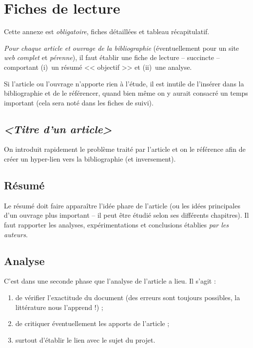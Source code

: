 \documentclass[11pt, french]{report-rd-info}
\begin{document}
\chapter{Fiches de lecture}
\label{ann:FichesLecture}

Cette annexe est \emph{obligatoire}, fiches détaillées et tableau récapitulatif.

\emph{Pour chaque article et ouvrage de la bibliographie} (éventuellement pour un site \emph{web} \emph{complet} et \emph{pérenne}), il faut établir une fiche de lecture -- succincte -- comportant (i)~un résumé << objectif >> et (ii)~une analyse.

Si l'article ou l'ouvrage n'apporte rien à l'étude, il est inutile de l'insérer dans la bibliographie et de le référencer, quand bien même on y aurait consacré un temps important (cela sera noté dans les fiches de suivi).

\section{\emph{<Titre d'un article>}}

On introduit rapidement le problème traité par l'article et on le référence afin de créer un hyper-lien vers la bibliographie \cite{Pascal-1671} (et inversement).

\section{Résumé}

Le résumé doit faire apparaître l'idée phare de l'article (ou les idées principales d'un ouvrage plus important -- il peut être étudié selon ses différents chapitres). Il faut rapporter les analyses, expérimentations et conclusions établies \emph{par les auteurs}.

\section{Analyse}

C'est dans une seconde phase que l'analyse de l'article a lieu. Il s'agit :
\begin{enumerate}
   \item de vérifier l'exactitude du document (des erreurs sont toujours possibles, la littérature nous l'apprend !) ;
   \item de critiquer éventuellement les apports de l'article ;
   \item surtout d'établir le lien avec le sujet du projet.
\end{enumerate}
\end{document}
